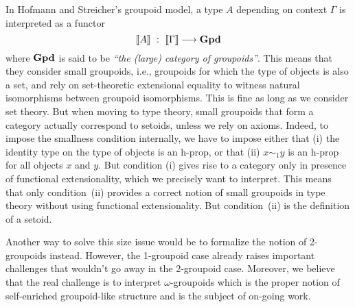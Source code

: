 In Hofmann and Streicher's groupoid model, a type $A$ depending on
context $\Gamma$ is interpreted as a functor 
$$
\sem{A} \ : \ \sem{\Gamma} \longrightarrow \GPD
$$
%
where $\mathbf{Gpd}$ is said to be \emph{``the (large) category of groupoids''}. 
%
This means that they consider small groupoids, 
i.e., groupoids for which the type of objects is also a set, and
rely on set-theoretic extensional equality to witness natural
isomorphisms between groupoid isomorphisms. This is fine as long as we
consider set theory.
%
%
%
But when moving to type theory, small groupoids that form a category
actually correspond to setoids, unless we rely on axioms. Indeed, to
impose the smallness condition internally, we have to impose either that
(i) the identity type on the type of objects is an h-prop, or that (ii)
$x \sim_1 y$ is an h-prop for all objects $x$ and $y$. But condition (i)
gives rise to a category only in presence of functional extensionality,
which we precisely want to interpret.
%
This means that only condition~(ii) provides a correct notion
of small groupoids in type theory without using functional
extensionality. But condition~(ii) is the definition of a setoid.
%
%

Another way to solve this size issue would be to formalize the notion of
2-groupoids instead. However, the 1-groupoid case already raises
important challenges that wouldn't go away in the 2-groupoid case. 
Moreover, we believe that the real challenge is to interpret
$\omega$-groupoids which is the proper notion of self-enriched 
groupoid-like structure and is the subject of on-going work.

